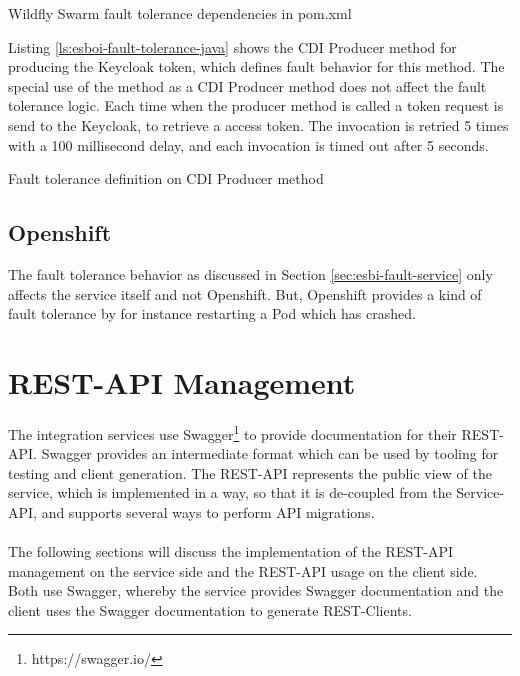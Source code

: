 \begin{listing}
	\caption{Wildfly Swarm fault tolerance dependencies in pom.xml}
	\label{ls:esboi-fault-tolerance-pom}
\end{listing}

Listing \vref{ls:esboi-fault-tolerance-java} shows the CDI Producer method for producing the Keycloak token, which defines fault behavior for this method. The special use of the method as a CDI Producer method does not affect the fault tolerance logic. Each time when the producer method is called a token request is send to the Keycloak, to retrieve a access token. The invocation is retried 5 times with a 100 millisecond delay, and each invocation is timed out after 5 seconds.

\begin{listing}
	\caption{Fault tolerance definition on CDI Producer method}
	\label{ls:esboi-fault-tolerance-java}
\end{listing} 

\subsection{Openshift}
\label{sec:esbi-fault-openshift}
The fault tolerance behavior as discussed in Section \vref{sec:esbi-fault-service} only affects the service itself and not Openshift. But, Openshift provides a kind of fault tolerance by for instance restarting a Pod which has crashed.
\newpage 

\section{REST-API Management}
\label{sec:esbi-api}
The integration services use Swagger\footnote{https://swagger.io/} to provide documentation for their REST-API. Swagger provides an intermediate format which can be used by tooling for testing and client generation. The REST-API represents the public view of the service, which is implemented in a way, so that it is de-coupled from the Service-API, and supports several ways to perform API migrations.
\\ \\
The following sections will discuss the implementation of the REST-API management on the service side and the REST-API usage on the client side. Both use Swagger, whereby the service provides Swagger documentation and the client uses the Swagger documentation to generate REST-Clients.

